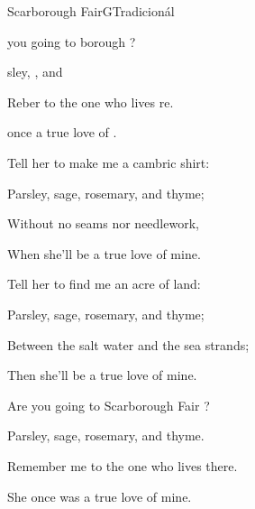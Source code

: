 \begin{song}{Scarborough Fair}{G}{Tradicionál}

\begin{SBVerse}

 you going to borough  ?

sley, ,  and 

Reber to the one who lives re.

 once  a true love of .

\end{SBVerse}

\begin{SBVerse}

Tell her to make me a cambric shirt:

Parsley, sage, rosemary, and thyme;

Without no seams nor needlework,

When she'll be a true love of mine.

\end{SBVerse}

\begin{SBVerse}

Tell her to find me an acre of land:

Parsley, sage, rosemary, and thyme;

Between the salt water and the sea strands;

Then she'll be a true love of mine.

\end{SBVerse}

\begin{SBVerse}

Are you going to Scarborough Fair ?

Parsley, sage, rosemary, and thyme.

Remember me to the one who lives there.

She once was a true love of mine.

\end{SBVerse}

\end{song}

\clearpage
